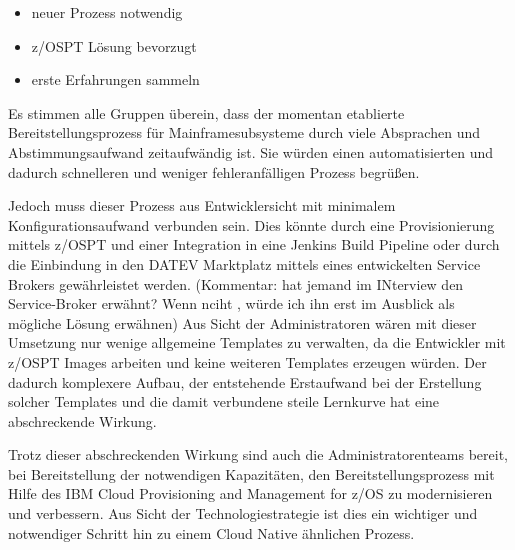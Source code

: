 \begin{itemize}
\item neuer Prozess notwendig
\item z/OSPT Lösung bevorzugt
\item erste Erfahrungen sammeln
\end{itemize}

Es stimmen alle Gruppen überein, dass der momentan etablierte Bereitstellungsprozess für Mainframesubsysteme durch viele Absprachen und Abstimmungsaufwand zeitaufwändig ist.
Sie würden einen automatisierten und dadurch schnelleren und weniger fehleranfälligen Prozess begrüßen.

Jedoch muss dieser Prozess aus Entwicklersicht mit minimalem Konfigurationsaufwand verbunden sein.
Dies könnte durch eine Provisionierung mittels z/OSPT und einer  Integration in eine Jenkins Build Pipeline oder durch die Einbindung in den \glqq DATEV Marktplatz\grqq{} mittels eines entwickelten \glqq Service Brokers\grqq{} gewährleistet werden. (Kommentar: hat jemand im INterview den Service-Broker erwähnt? Wenn nciht , würde ich ihn erst im Ausblick als mögliche Lösung erwähnen)
Aus Sicht der Administratoren wären mit dieser Umsetzung nur wenige allgemeine Templates zu verwalten, da die Entwickler mit z/OSPT Images arbeiten und keine weiteren Templates erzeugen würden.
Der dadurch komplexere Aufbau, der entstehende Erstaufwand bei der Erstellung solcher Templates  und die damit verbundene steile Lernkurve hat eine abschreckende Wirkung.

Trotz dieser abschreckenden Wirkung sind auch die Administratorenteams bereit, bei Bereitstellung der notwendigen Kapazitäten, den Bereitstellungsprozess mit Hilfe des \glqq IBM Cloud Provisioning and Management for z/OS\grqq{} zu modernisieren und verbessern.
Aus Sicht der Technologiestrategie ist dies ein wichtiger und notwendiger Schritt hin zu einem Cloud Native ähnlichen Prozess.
